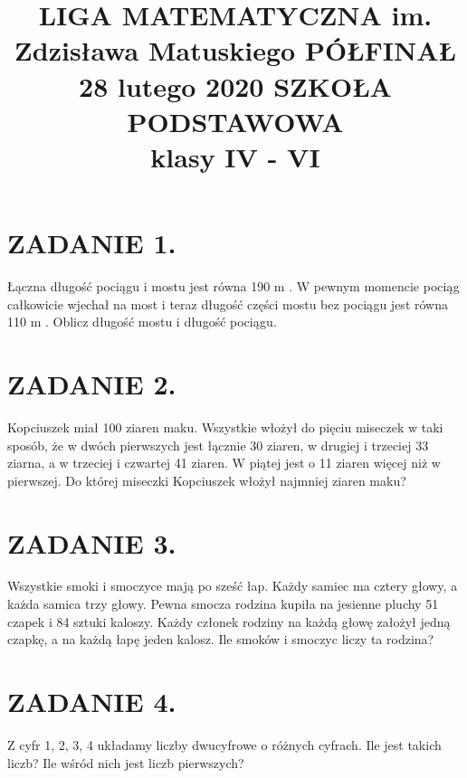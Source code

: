 \documentclass[10pt]{article}
\title{LIGA MATEMATYCZNA im. Zdzisława Matuskiego PÓŁFINAŁ 28 lutego 2020 SZKOŁA PODSTAWOWA \\
 klasy IV - VI }
\author{}
\date{}
\begin{document}
\maketitle
\section*{ZADANIE 1.}
Łączna długość pociągu i mostu jest równa 190 m . W pewnym momencie pociąg całkowicie wjechał na most i teraz długość części mostu bez pociągu jest równa 110 m . Oblicz długość mostu i długość pociągu.

\section*{ZADANIE 2.}
Kopciuszek miał 100 ziaren maku. Wszystkie włożył do pięciu miseczek w taki sposób, że w dwóch pierwszych jest łącznie 30 ziaren, w drugiej i trzeciej 33 ziarna, a w trzeciej i czwartej 41 ziaren. W piątej jest o 11 ziaren więcej niż w pierwszej. Do której miseczki Kopciuszek włożył najmniej ziaren maku?

\section*{ZADANIE 3.}
Wszystkie smoki i smoczyce mają po sześć łap. Każdy samiec ma cztery głowy, a każda samica trzy głowy. Pewna smocza rodzina kupiła na jesienne pluchy 51 czapek i 84 sztuki kaloszy. Każdy członek rodziny na każdą głowę założył jedną czapkę, a na każdą łapę jeden kalosz. Ile smoków i smoczyc liczy ta rodzina?

\section*{ZADANIE 4.}
Z cyfr 1, 2, 3, 4 układamy liczby dwucyfrowe o różnych cyfrach. Ile jest takich liczb? Ile wśród nich jest liczb pierwszych?
\end{document}
